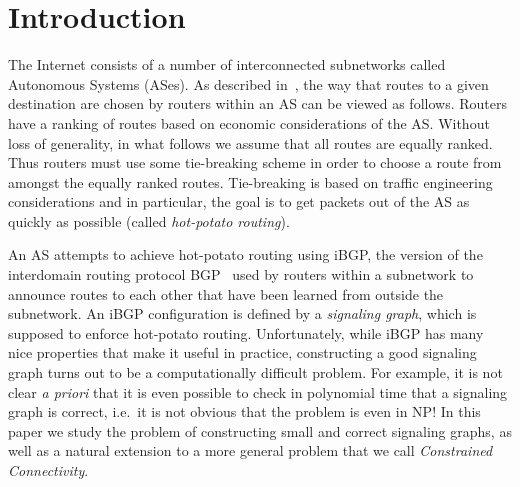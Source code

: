 \documentclass[11pt,letterpaper]{article}
\theoremstyle{definition}
\begin{document}
\section{Introduction}


The Internet consists of a number of interconnected subnetworks
called Autonomous Systems (ASes).
As described in~\cite{basu}, the way that routes to a given
destination are chosen by routers within an AS can be viewed as follows.
Routers have a ranking of routes based on economic considerations of the AS.
Without loss of generality, in what follows
we assume that all routes are equally ranked.
Thus routers must use some tie-breaking scheme in order to choose a route
from amongst the equally ranked routes.
Tie-breaking is based on traffic engineering considerations and
in particular, the goal is to get packets out of the AS as quickly
as possible (called {\em hot-potato routing}).

An AS attempts to achieve hot-potato routing using iBGP, the version of
the interdomain routing protocol BGP~\cite{stewart:99} used by routers within
a subnetwork to announce routes to each other that have been
learned from outside the subnetwork.  An iBGP configuration is defined by a \emph{signaling graph}, which is supposed to enforce hot-potato routing.  Unfortunately, while iBGP has many nice properties that make it useful in practice, constructing a good signaling graph turns out to be a computationally difficult problem.  For example, it is not clear \emph{a priori} that it is even possible to check in polynomial time that a signaling graph is correct, i.e.~it is not obvious that the problem is even in NP!  In this paper we study the problem of constructing small and correct signaling graphs, as well as a natural extension to a more general problem that we call \emph{Constrained Connectivity}.
\end{document}
